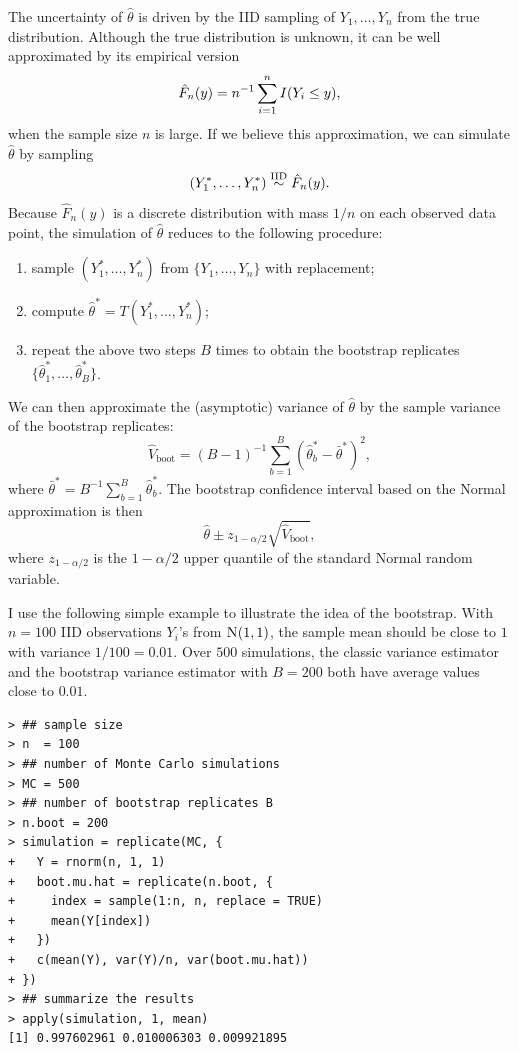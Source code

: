 The uncertainty of $\hat\theta$ is driven by the IID sampling of $Y_1,\ldots, Y_n$ from the true distribution. Although the true distribution is unknown, it can be well approximated by its empirical version 
$$
\hat{F}_n(y) = n^{-1} \sum_{i=1}^n I(Y_i \leq y),
$$
when the sample size $n$ is large. If we believe this approximation, we can simulate $\hat\theta$ by sampling 
$$
(Y_1^*,\ldots, Y_n^* ) \stackrel{\textup{IID}}{\sim} \hat{F}_n(y).
$$ 
Because $\hat{F}_n(y) $ is a discrete distribution with mass $1/n$ on each observed data point, the simulation of $\hat\theta$ reduces to the following procedure: 
\begin{enumerate}
\item
sample $(Y_1^*,\ldots, Y_n^* ) $ from $\{Y_1,\ldots, Y_n \}$ with replacement;
\item
compute $\hat{\theta}^* = T(Y_1^*, \ldots, Y_n^*)$;
\item
repeat the above two steps $B$ times to obtain the bootstrap replicates $\{  \hat{\theta}^*_1, \ldots, \hat{\theta}^*_B \}$.
\end{enumerate}




We can then approximate the (asymptotic) variance of $\hat\theta$ by the sample variance of the bootstrap replicates:
$$
\hat{V}_\text{boot} = (B-1)^{-1} \sum_{b=1}^B  (\hat{\theta}^*_b - \bar{\theta}^*)^2,
$$
where $\bar{\theta}^* = B^{-1}\sum_{b=1}^B \hat{\theta}^*_b $. The bootstrap confidence interval based on the Normal approximation is then
$$
\hat\theta \pm  z_{1-\alpha/2} \sqrt{\hat{V}_\text{boot} },
$$
where $z_{1-\alpha/2}$ is the $1-\alpha/2$ upper quantile of the standard Normal random variable.



I use the following simple example to illustrate the idea of the bootstrap. With $n=100$ IID observations $Y_i$'s from $\textsc{N}(1,1)$, the sample mean should be close to $1$ with variance $1/100 = 0.01$. Over $500$ simulations, the classic variance estimator and the bootstrap variance estimator with $B=200$ both have average values close to $0.01$. 

\begin{lstlisting}
> ## sample size
> n  = 100
> ## number of Monte Carlo simulations
> MC = 500
> ## number of bootstrap replicates B
> n.boot = 200
> simulation = replicate(MC, {
+   Y = rnorm(n, 1, 1)
+   boot.mu.hat = replicate(n.boot, {
+     index = sample(1:n, n, replace = TRUE)
+     mean(Y[index])
+   })
+   c(mean(Y), var(Y)/n, var(boot.mu.hat))
+ })
> ## summarize the results
> apply(simulation, 1, mean)
[1] 0.997602961 0.010006303 0.009921895
\end{lstlisting}




